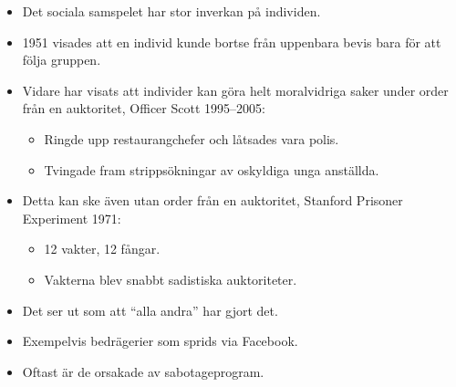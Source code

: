 \documentclass{beamer}
\begin{document}
\begin{frame}{\insertsubsectionhead}
  \begin{itemize}
    \item Det sociala samspelet har stor inverkan på individen.

    \item 1951 visades att en individ kunde bortse från uppenbara bevis bara 
      för att följa gruppen.

    \item Vidare har visats att individer kan göra helt moralvidriga saker 
      under order från en auktoritet, Officer Scott 1995--2005:
      \begin{itemize}
        \item Ringde upp restaurangchefer och låtsades vara polis.
        \item Tvingade fram strippsökningar av oskyldiga unga anställda.
      \end{itemize}

    \item Detta kan ske även utan order från en auktoritet, Stanford Prisoner 
      Experiment 1971:
      \begin{itemize}
        \item 12 vakter, 12 fångar.
        \item Vakterna blev snabbt sadistiska auktoriteter.
      \end{itemize}

  \end{itemize}
\end{frame}

\begin{frame}{\insertsubsectionhead}
  \begin{itemize}
    \item Det ser ut som att \enquote{alla andra} har gjort det.
    \item Exempelvis bedrägerier som sprids via Facebook.
    \item Oftast är de orsakade av sabotageprogram.
  \end{itemize}
\end{frame}

%
%
%
%
\end{document}
